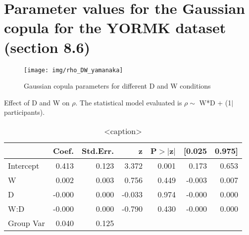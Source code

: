 \documentclass{article}
\begin{document}





\section{Parameter values for the Gaussian copula for the YORMK dataset (section 8.6)}

\begin{figure}[htbp]
    \centering
    \texttt{[image: img/rho\_DW\_yamanaka]}
    \caption{Gaussian copula parameters for different D and W conditions}
    \label{fig:rho_DW}
\end{figure}

\begin{table}[htbp]
    \begin{center}
        \caption{Effect of D and W on $\rho$. The statistical model evaluated is $\rho \sim$  W*D + (1$|$participants).}
        \begin{tabular}{lrrrrrr}
        \hline
                  &  Coef. & Std.Err. &      z & P$> |$z$|$ & [0.025 & 0.975]  \\
        \hline
        Intercept &  0.413 &    0.123 &  3.372 &       0.001 &  0.173 &  0.653  \\
        W         &  0.002 &    0.003 &  0.756 &       0.449 & -0.003 &  0.007  \\
        D         & -0.000 &    0.000 & -0.033 &       0.974 & -0.000 &  0.000  \\
        W:D       & -0.000 &    0.000 & -0.790 &       0.430 & -0.000 &  0.000  \\
        Group Var &  0.040 &    0.125 &        &             &        &         \\
        \hline
        \end{tabular}
        \end{center}
        
    \caption{<caption>}
    \label{<label>}
\end{table}
\end{document}
